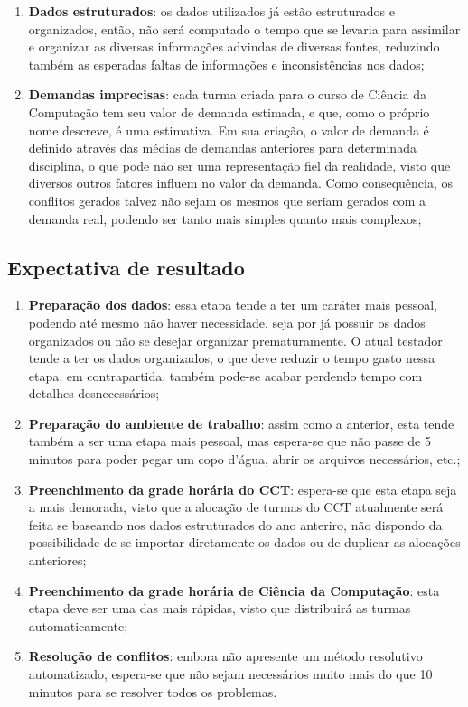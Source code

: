 \begin{enumerate}
\begin{enumerate}
          \item \textbf{Dados estruturados}: os dados utilizados já estão estruturados e organizados, então, não será computado o tempo que se levaria para assimilar e organizar as diversas informações advindas de diversas fontes, reduzindo também as esperadas faltas de informações e inconsistências nos dados;
          \item \textbf{Demandas imprecisas}: cada turma criada para o curso de Ciência da Computação tem seu valor de demanda estimada, e que, como o próprio nome descreve, é uma estimativa. Em sua criação, o valor de demanda é definido através das médias de demandas anteriores para determinada disciplina, o que pode não ser uma representação fiel da realidade, visto que diversos outros fatores influem no valor da demanda. Como consequência, os conflitos gerados talvez não sejam os mesmos que seriam gerados com a demanda real, podendo ser tanto mais simples quanto mais complexos;
        \end{enumerate}
\end{enumerate}

\subsection{Expectativa de resultado}

\begin{enumerate}
  \item \textbf{Preparação dos dados}: essa etapa tende a ter um caráter mais pessoal, podendo até mesmo não haver necessidade, seja por já possuir os dados organizados ou não se desejar organizar prematuramente. O atual testador tende a ter os dados organizados, o que deve reduzir o tempo gasto nessa etapa, em contrapartida, também pode-se acabar perdendo tempo com detalhes desnecessários;
  \item \textbf{Preparação do ambiente de trabalho}: assim como a anterior, esta tende também a ser uma etapa mais pessoal, mas espera-se que não passe de 5 minutos para poder pegar um copo d'água, abrir os arquivos necessários, etc.;
  \item \textbf{Preenchimento da grade horária do CCT}: espera-se que esta etapa seja a mais demorada, visto que a alocação de turmas do CCT atualmente será feita se baseando nos dados estruturados do ano anteriro, não dispondo da possibilidade de se importar diretamente os dados ou de duplicar as alocações anteriores;
  \item \textbf{Preenchimento da grade horária de Ciência da Computação}: esta etapa deve ser uma das mais rápidas, visto que distribuirá as turmas automaticamente;
  \item \textbf{Resolução de conflitos}: embora não apresente um método resolutivo automatizado, espera-se que não sejam necessários muito mais do que 10 minutos para se resolver todos os problemas.
\end{enumerate}

